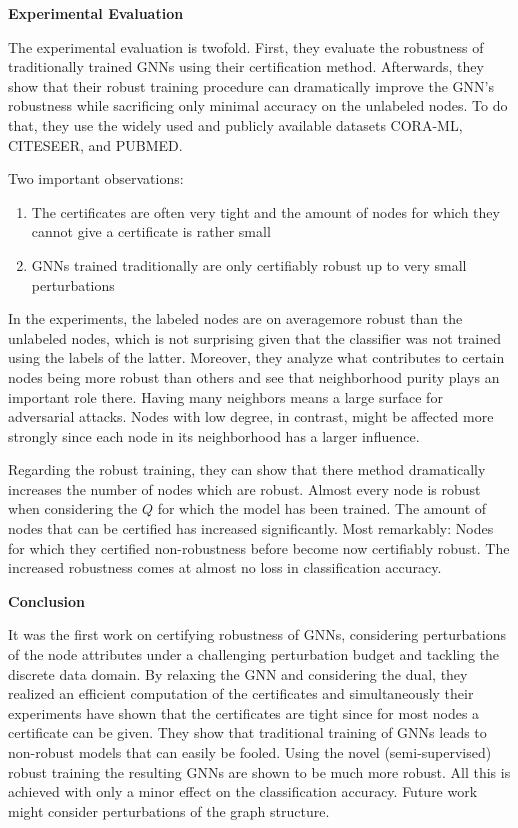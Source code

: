 \documentclass[a4paper,preprint]{sig-alternate}
\begin{document}
\textbf{Experimental Evaluation}\newline

The experimental evaluation is twofold. First, they evaluate the robustness of traditionally trained GNNs using their certification method.
Afterwards, they show that their robust training procedure can dramatically improve the GNN's robustness while sacrificing only minimal
accuracy on the unlabeled nodes. To do that, they use the widely used and publicly available datasets CORA-ML, CITESEER, and PUBMED.

Two important observations:\newline
\begin{enumerate}
    \item The certificates are often very tight and the amount of nodes for which they cannot give a certificate is rather small
    \item GNNs trained traditionally are only certifiably robust up to very small perturbations
\end{enumerate}
In the experiments, the labeled nodes are on averagemore robust than the unlabeled nodes, which is not surprising given that the classifier
was not trained using the labels of the latter.\newline
Moreover, they analyze what contributes to certain nodes being more robust than others and see that neighborhood purity plays an important role there.
Having many neighbors means a large surface for adversarial attacks. Nodes with low degree, in contrast, might be affected more strongly since each
node in its neighborhood has a larger influence.\newline

Regarding the robust training, they can show that there method dramatically increases the number of nodes which are robust. Almost every node
is robust when considering the $Q$ for which the model has been trained. The amount of nodes that can be certified has increased significantly.
Most remarkably: Nodes for which they certified non-robustness before become now certifiably robust.
The increased robustness comes at almost no loss in classification accuracy.\newline

\textbf{Conclusion}\newline

It was the first work on certifying robustness of GNNs, considering perturbations of the node attributes under a challenging perturbation budget
and tackling the discrete data domain. By relaxing the GNN and considering the dual, they realized an efficient computation of the certificates
and simultaneously their experiments have shown that the certificates are tight since for most nodes a certificate can be given.
They show that traditional training of GNNs leads to non-robust models that can easily be fooled.
Using the novel (semi-supervised) robust training the resulting GNNs are shown to be much more robust. All this is achieved with only a minor
effect on the classification accuracy. Future work might consider perturbations of the graph structure.
\end{document}
